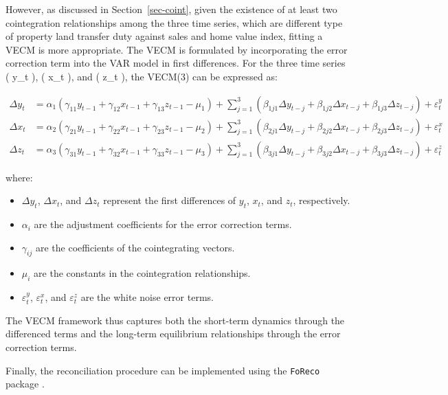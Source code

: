\documentclass[
  11pt,
  a4paper,
]{article}
\providecommand{\tightlist}{%
  \setlength{\itemsep}{0pt}\setlength{\parskip}{0pt}}\usepackage{longtable,booktabs,array}
\begin{document}
However, as discussed in Section~\ref{sec-coint}, given the existence of
at least two cointegration relationships among the three time series,
which are different type of property land transfer duty against sales
and home value index, fitting a VECM is more appropriate. The VECM is
formulated by incorporating the error correction term into the VAR model
in first differences. For the three time series ( y\_t ), ( x\_t ), and
( z\_t ), the VECM(3) can be expressed as:

\[
\begin{aligned}
\Delta y_t &= \alpha_1 (\gamma_{11} y_{t-1} + \gamma_{12} x_{t-1} + \gamma_{13} z_{t-1} - \mu_1) + \sum_{j=1}^{3} \left( \beta_{1j1} \Delta y_{t-j} + \beta_{1j2} \Delta x_{t-j} + \beta_{1j3} \Delta z_{t-j} \right) + \varepsilon_t^y \\
\Delta x_t &= \alpha_2 (\gamma_{21} y_{t-1} + \gamma_{22} x_{t-1} + \gamma_{23} z_{t-1} - \mu_2) + \sum_{j=1}^{3} \left( \beta_{2j1} \Delta y_{t-j} + \beta_{2j2} \Delta x_{t-j} + \beta_{2j3} \Delta z_{t-j} \right) + \varepsilon_t^x \\
\Delta z_t &= \alpha_3 (\gamma_{31} y_{t-1} + \gamma_{32} x_{t-1} + \gamma_{33} z_{t-1} - \mu_3) + \sum_{j=1}^{3} \left( \beta_{3j1} \Delta y_{t-j} + \beta_{3j2} \Delta x_{t-j} + \beta_{3j3} \Delta z_{t-j} \right) + \varepsilon_t^z
\end{aligned}
\]

where:

\begin{itemize}
\tightlist
\item
  \(\Delta y_t\), \(\Delta x_t\), and \(\Delta z_t\) represent the first
  differences of \(y_t\), \(x_t\), and \(z_t\), respectively.
\item
  \(\alpha_i\) are the adjustment coefficients for the error correction
  terms.
\item
  \(\gamma_{ij}\) are the coefficients of the cointegrating vectors.
\item
  \(\mu_i\) are the constants in the cointegration relationships.
\item
  \(\varepsilon_t^y\), \(\varepsilon_t^x\), and \(\varepsilon_t^z\) are
  the white noise error terms.
\end{itemize}

The VECM framework thus captures both the short-term dynamics through
the differenced terms and the long-term equilibrium relationships
through the error correction terms.

Finally, the reconciliation procedure can be implemented using the
\texttt{FoReco} package \textcite{FoReco}.
\end{document}
